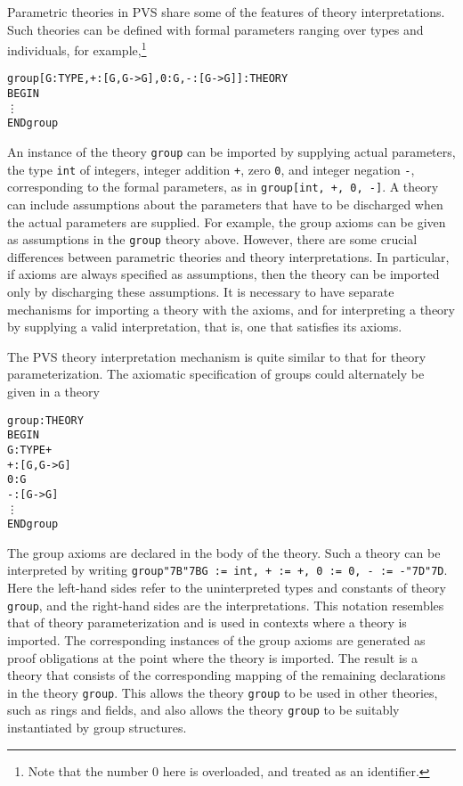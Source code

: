 \documentclass[11pt,twoside,openright,titlepage]{cslreport}
\def\mapb{\char"7B\char"7B}
\def\mape{\char"7D\char"7D}
\begin{document}
Parametric theories in PVS share some of the features of theory
interpretations.  Such theories can be defined with formal parameters
ranging over types and individuals, for example,\footnote{Note that the
number 0 here is overloaded, and treated as an identifier.}
{\smaller\begin{alltt}
group[G: TYPE, + : [G, G -> G], 0: G, -: [G -> G]]: THEORY
  BEGIN
    \vdots
  END group
\end{alltt}}
An instance of the theory \texttt{group} can be imported by supplying
actual parameters, the type \texttt{int} of integers, integer addition
{\tt +}, zero \texttt{0}, and integer negation {\tt -}, corresponding to
the formal parameters, as in {\tt group[int, +, 0, -]}\@.  A theory can
include assumptions about the parameters that have to be discharged when
the actual parameters are supplied.  For example, the group axioms can
be given as assumptions in the \texttt{group} theory above.  However,
there are some crucial differences between parametric theories and theory
interpretations.  In particular, if axioms are always specified as
assumptions, then the theory can be imported only by discharging these
assumptions.  It is necessary to have separate mechanisms for importing a
theory with the axioms, and for interpreting a theory by supplying a valid
interpretation, that is, one that satisfies its axioms.

The PVS theory interpretation mechanism is quite similar to that for
theory parameterization.  The axiomatic specification of groups could
alternately be given in a theory
{\smaller\begin{alltt}
group: THEORY
 BEGIN
  G: TYPE+
  +: [G, G -> G]
  0: G
  -: [G -> G]
   \vdots
 END group
\end{alltt}}
The group axioms are declared in the body of the theory.  Such a theory
can be interpreted by writing \texttt{\smaller group\mapb{}G := int, + :=
+, 0 := 0, - := -\mape{}}\@.  Here the left-hand sides refer to the
uninterpreted types and constants of theory \texttt{group}, and the
right-hand sides are the interpretations.  This notation resembles that of
theory parameterization and is used in contexts where a theory is
imported.  The corresponding instances of the group axioms are generated
as proof obligations at the point where the theory is imported.  The
result is a theory that consists of the corresponding mapping of the
remaining declarations in the theory \texttt{group}\@.  This allows the
theory \texttt{group} to be used in other theories, such as rings and
fields, and also allows the theory \texttt{group} to be suitably
instantiated by group structures.
\end{document}
